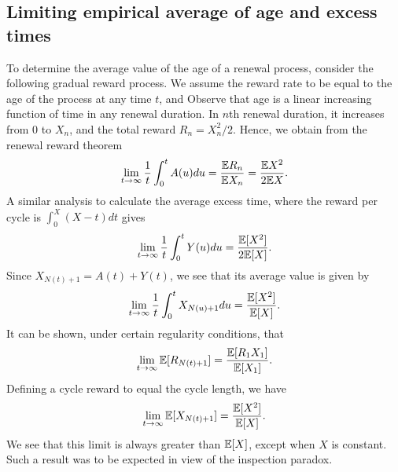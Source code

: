 \documentclass[a4paper,10pt,english]{article}
\begin{document}
\subsection{Limiting empirical average of age and excess times}
To determine the average value of the age of a renewal process, consider the following gradual reward process. 
We assume the reward rate to be equal to the age of the process at any time $t$, 
and 
Observe that age is a linear increasing function of time in any renewal duration. 
In $n$th renewal duration, it increases from $0$ to $X_n$, and the total reward $R_n = X_n^2/2$. 
Hence, we obtain from the renewal reward theorem 
\begin{align*}
\lim_{t \to \infty}\frac{1}{t}\int_0^t A(u)du = \frac{\mathbb{E} R_n}{\mathbb{E} X_n} = \frac{\mathbb{E} X^2}{2\mathbb{E} X}.
\end{align*}
A similar analysis to calculate the average excess time, where the reward per cycle is $\int_0^X (X-t)dt$ gives 
\begin{align*}
\lim_{t\to \infty}\frac{1}{t}\int_0^t Y(u)du = \frac{\mathbb{E}[X^2]}{2\mathbb{E}[X]}.
\end{align*}
Since $X_{N(t)+1}=A(t)+Y(t)$, we see that its average value is given by
\begin{align*}
\lim_{t\to \infty}\frac{1}{t}\int_0^t X_{N(u)+1}du = \frac{\mathbb{E}[X^2]}{\mathbb{E}[X]}.
\end{align*}
It can be shown, under certain regularity conditions, that 
\begin{align*}
\lim_{t\to \infty} \mathbb{E}[R_{N(t)+1}] = \frac{\mathbb{E}[R_1 X_1]}{\mathbb{E}[X_1]}.
\end{align*}
Defining a cycle reward to equal the cycle length, we have 
\begin{align*}
\lim_{t\to \infty} \mathbb{E}[X_{N(t)+1}] = \frac{\mathbb{E}[X^2]}{\mathbb{E}[X]}.
\end{align*}
We see that this limit is always greater than $\mathbb{E}[X]$, except when $X$ is constant. Such a result was to be expected in view of the inspection paradox. 
\end{document}
